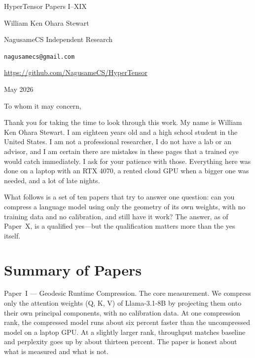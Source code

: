 \documentclass[11pt]{article}
\begin{document}
\vspace*{2cm}

\begin{center}
{\LARGE HyperTensor Papers I--XIX}

\vspace{10pt}

William Ken Ohara Stewart

NagusameCS Independent Research

\texttt{nagusamecs@gmail.com}

\url{https://github.com/NagusameCS/HyperTensor}

\vspace{10pt}

May 2026
\end{center}

\vspace{18pt}

To whom it may concern,

\vspace{8pt}

Thank you for taking the time to look through this work. My name is William
Ken Ohara Stewart. I am eighteen years old and a high school student in the
United States. I am not a professional researcher, I do not have a lab or an
advisor, and I am certain there are mistakes in these pages that a trained eye
would catch immediately. I ask for your patience with those. Everything here
was done on a laptop with an RTX 4070, a rented cloud GPU when a bigger one was
needed, and a lot of late nights.

What follows is a set of ten papers that try to answer one question: can you
compress a language model using only the geometry of its own weights, with no
training data and no calibration, and still have it work? The answer, as of
Paper~X, is a qualified yes---but the qualification matters more than the yes
itself.

\vspace{10pt}

\section*{Summary of Papers}

\noindent Paper~I --- Geodesic Runtime Compression.
The core measurement. We compress only the attention weights (Q, K, V) of
Llama-3.1-8B by projecting them onto their own principal components, with no
calibration data. At one compression rank, the compressed model runs about six
percent faster than the uncompressed model on a laptop GPU. At a slightly larger
rank, throughput matches baseline and perplexity goes up by about thirteen
percent. The paper is honest about what is measured and what is not.
\end{document}
